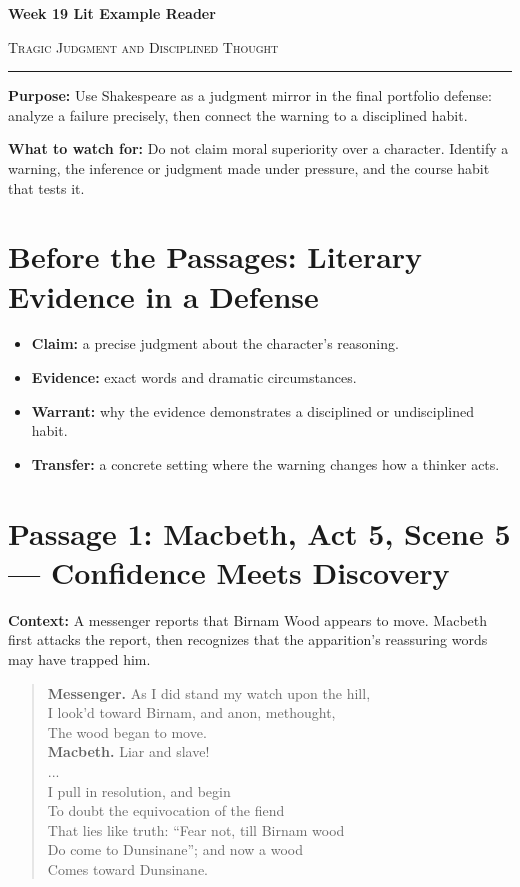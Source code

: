 \documentclass[12pt]{article}
\newenvironment{playpassage}{\begin{quote}\footnotesize\setlength{\parskip}{0.08em}\setlength{\parindent}{0pt}}{\end{quote}}
\newcommand{\speaker}[1]{\textbf{#1.}}
\begin{document}
\begin{center}
{\LARGE\bfseries Week 19 Lit Example Reader}\par\vspace{0.02em}
{\large\scshape Tragic Judgment and Disciplined Thought}\par\vspace{0.06em}
\rule{0.78\textwidth}{0.5pt}
\end{center}

\textbf{Purpose:} Use Shakespeare as a judgment mirror in the final portfolio defense: analyze a failure precisely, then connect the warning to a disciplined habit.

\textbf{What to watch for:} Do not claim moral superiority over a character. Identify a warning, the inference or judgment made under pressure, and the course habit that tests it.

\section*{Before the Passages: Literary Evidence in a Defense}
\begin{itemize}[leftmargin=1.3em,itemsep=0.05em,topsep=0.08em,parsep=0.03em]
\item \textbf{Claim:} a precise judgment about the character's reasoning.
\item \textbf{Evidence:} exact words and dramatic circumstances.
\item \textbf{Warrant:} why the evidence demonstrates a disciplined or undisciplined habit.
\item \textbf{Transfer:} a concrete setting where the warning changes how a thinker acts.
\end{itemize}

\section*{Passage 1: Macbeth, Act 5, Scene 5 --- Confidence Meets Discovery}
\textbf{Context:} A messenger reports that Birnam Wood appears to move. Macbeth first attacks the report, then recognizes that the apparition's reassuring words may have trapped him.
\begin{playpassage}
\speaker{Messenger} As I did stand my watch upon the hill,\\
I look'd toward Birnam, and anon, methought,\\
The wood began to move.\\[0.2em]
\speaker{Macbeth} Liar and slave!\\
...\\
I pull in resolution, and begin\\
To doubt the equivocation of the fiend\\
That lies like truth: ``Fear not, till Birnam wood\\
Do come to Dunsinane''; and now a wood\\
Comes toward Dunsinane.
\end{playpassage}
\end{document}
